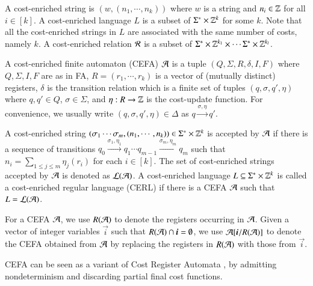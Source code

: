 

A cost-enriched string is $(w, (n_1, \cdots, n_k))$ where $w$ is a string and $n_i \in \mathbb{Z}$ for all $i \in [k]$. 
A cost-enriched language $L$ is a subset of $\Sigma^* \times \mathbb{Z}^k$ for some $k$. Note that all the cost-enriched strings in $L$ are associated with the same number of costs, namely $k$.
A cost-enriched relation $\mathcal{R}$ is a subset of $\Sigma^* \times \mathbb{Z}^{k_1} \times \cdots \Sigma^* \times \mathbb{Z}^{k_l}$.

\begin{definition}
	A cost-enriched finite automaton (CEFA) $\mathcal{A}$ is a tuple $(Q, \Sigma, R, \delta, I, F)$ where $Q, \Sigma, I, F$ are as in FA, $R=(r_1, \cdots, r_k)$ is a vector of (mutually distinct) registers, $\delta$ is the transition relation which is a finite set of tuples $(q, \sigma, q', \eta)$ where $q, q' \in Q$, $\sigma \in \Sigma$, and $\eta: R \rightarrow \mathbb{Z}$ is the cost-update function. For convenience, we usually write $(q, \sigma, q', \eta) \in \Delta$ as $q \xrightarrow{\sigma, \eta} q'$.
	
	A cost-enriched string $(\sigma_1 \cdots \sigma_m, (n_1, \cdots,n_k)) \in \Sigma^* \times \mathbb{Z}^k$ is accepted by $\mathcal{A}$ if there is a sequence of transitions $q_0 \xrightarrow{\sigma_1, \eta_1} q_1 \cdots q_{m-1} \xrightarrow{\sigma_m, \eta_m} q_m$ such that $n_i = \sum_{1\leq j\leq m}\eta_j(r_i)$ for each $i \in [k]$. The set of cost-enriched strings accepted by $\mathcal{A}$ is denoted as $\mathcal{L}(\mathcal{A})$. A cost-enriched language $L \subseteq \Sigma^* \times \mathbb{Z}^k$ is called a cost-enriched regular language (CERL) if there is a CEFA $\mathcal{A}$ such that $L = \mathcal{L}(\mathcal{A})$.
\end{definition}


For a CEFA $\mathcal{A}$, we use $R(\mathcal{A})$ to denote the registers occurring in $\mathcal{A}$. %
Given a vector of integer variables $\vec{i}$ such that $R(\Aut) \cap \vec{i} = \emptyset$, we use $\Aut[\vec{i}/R(\Aut)]$ to denote the CEFA obtained from $\mathcal{A}$ by replacing the registers in $R(\mathcal{A})$ with those from $\vec{i}$. 



CEFA can be seen as a variant of Cost Register Automata \cite{RLJ+13}, by admitting nondeterminism and discarding partial final cost functions. 

